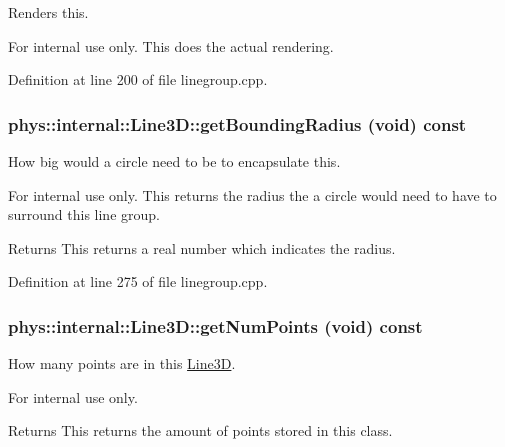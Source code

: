 Renders this. 

\begin{DoxyInternal}{For internal use only.}
This does the actual rendering. \end{DoxyInternal}


Definition at line 200 of file linegroup.cpp.

\hypertarget{classphys_1_1internal_1_1Line3D_a3fdd0ff2b7b22cebc71f796431afc7c8}{
\subsubsection[{getBoundingRadius}]{ phys::internal::Line3D::getBoundingRadius (void) const}}
\label{d4/db5/classphys_1_1internal_1_1Line3D_a3fdd0ff2b7b22cebc71f796431afc7c8}


How big would a circle need to be to encapsulate this. 

\begin{DoxyInternal}{For internal use only.}
This returns the radius the a circle would need to have to surround this line group. \begin{DoxyReturn}{Returns}
This returns a real number which indicates the radius. 
\end{DoxyReturn}
\end{DoxyInternal}


Definition at line 275 of file linegroup.cpp.

\hypertarget{classphys_1_1internal_1_1Line3D_ab72a9dab3a355035c24c15e4a737ea2f}{
\subsubsection[{getNumPoints}]{ phys::internal::Line3D::getNumPoints (void) const}}
\label{d4/db5/classphys_1_1internal_1_1Line3D_ab72a9dab3a355035c24c15e4a737ea2f}


How many points are in this \hyperlink{classphys_1_1internal_1_1Line3D}{Line3D}. 

\begin{DoxyInternal}{For internal use only.}
\begin{DoxyReturn}{Returns}
This returns the amount of points stored in this class. 
\end{DoxyReturn}
\end{DoxyInternal}


